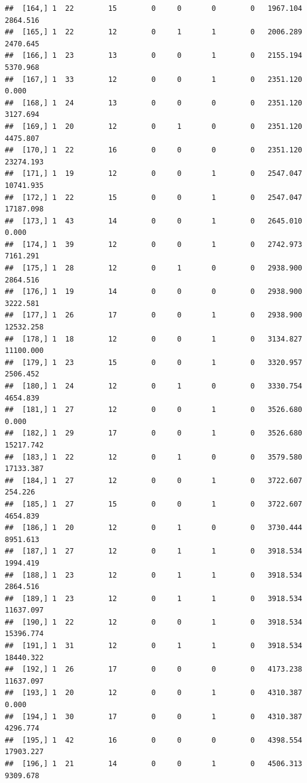 \documentclass[
]{article}
\begin{document}
\begin{verbatim}
##  [164,] 1  22        15        0     0       0        0   1967.104   2864.516
##  [165,] 1  22        12        0     1       1        0   2006.289   2470.645
##  [166,] 1  23        13        0     0       1        0   2155.194   5370.968
##  [167,] 1  33        12        0     0       1        0   2351.120      0.000
##  [168,] 1  24        13        0     0       0        0   2351.120   3127.694
##  [169,] 1  20        12        0     1       0        0   2351.120   4475.807
##  [170,] 1  22        16        0     0       0        0   2351.120  23274.193
##  [171,] 1  19        12        0     0       1        0   2547.047  10741.935
##  [172,] 1  22        15        0     0       1        0   2547.047  17187.098
##  [173,] 1  43        14        0     0       1        0   2645.010      0.000
##  [174,] 1  39        12        0     0       1        0   2742.973   7161.291
##  [175,] 1  28        12        0     1       0        0   2938.900   2864.516
##  [176,] 1  19        14        0     0       0        0   2938.900   3222.581
##  [177,] 1  26        17        0     0       1        0   2938.900  12532.258
##  [178,] 1  18        12        0     0       1        0   3134.827  11100.000
##  [179,] 1  23        15        0     0       1        0   3320.957   2506.452
##  [180,] 1  24        12        0     1       0        0   3330.754   4654.839
##  [181,] 1  27        12        0     0       1        0   3526.680      0.000
##  [182,] 1  29        17        0     0       1        0   3526.680  15217.742
##  [183,] 1  22        12        0     1       0        0   3579.580  17133.387
##  [184,] 1  27        12        0     0       1        0   3722.607    254.226
##  [185,] 1  27        15        0     0       1        0   3722.607   4654.839
##  [186,] 1  20        12        0     1       0        0   3730.444   8951.613
##  [187,] 1  27        12        0     1       1        0   3918.534   1994.419
##  [188,] 1  23        12        0     1       1        0   3918.534   2864.516
##  [189,] 1  23        12        0     1       1        0   3918.534  11637.097
##  [190,] 1  22        12        0     0       1        0   3918.534  15396.774
##  [191,] 1  31        12        0     1       1        0   3918.534  18440.322
##  [192,] 1  26        17        0     0       0        0   4173.238  11637.097
##  [193,] 1  20        12        0     0       1        0   4310.387      0.000
##  [194,] 1  30        17        0     0       1        0   4310.387   4296.774
##  [195,] 1  42        16        0     0       0        0   4398.554  17903.227
##  [196,] 1  21        14        0     0       1        0   4506.313   9309.678

\end{verbatim}
\end{document}
